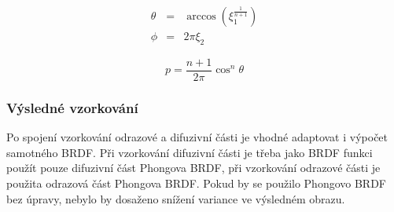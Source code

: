 \documentclass[czech,master,dept460,male,cpp,cpdeclaration]{diploma}
\newcommand{\randU}{\xi_{1}}
\newcommand{\randV}{\xi_{2}}
\begin{document}
\begin{eqnarray}
    \theta & = & \arccos(\randU^{\frac{1}{n+1}}) \nonumber \\
    \phi & = & 2\pi\randV\label{eq:phongSpecularSample}
\end{eqnarray}

\begin{equation} \label{eq:phongSpecularSamplePdf}
    p = \frac{n+1}{2\pi}\cos^n\theta
\end{equation}

\subsubsection{Výsledné vzorkování}
Po spojení vzorkování odrazové a difuzivní části je vhodné adaptovat i výpočet samotného BRDF. Při vzorkování difuzivní části je třeba jako BRDF funkci použít pouze difuzivní část Phongova BRDF, při vzorkování odrazové části je použita odrazová část Phongova BRDF. Pokud by se použilo Phongovo BRDF bez úpravy, nebylo by dosaženo snížení variance ve výsledném obrazu. \cite{KrivanekBRDFIBL}

\printbibliography[title={Literatura}, heading=bibintoc]

\appendix
\end{document}
